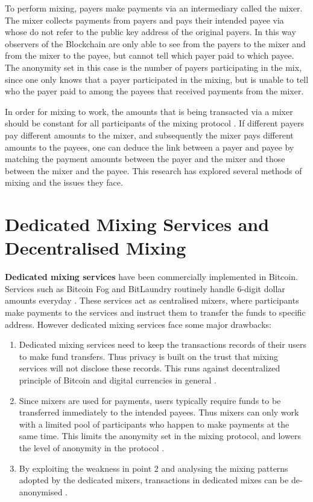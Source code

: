 To perform mixing, payers make payments via an intermediary called the mixer. The mixer collects payments from payers and pays their intended payee via  whose  do not refer to the public key address of the original payers. In this way observers of the Blockchain are only able to see   from the payers to the mixer and from the mixer to the payee, but cannot tell which payer paid to which payee. The anonymity set in this case is the number of payers participating in the mix, since one only knows that a payer participated in the mixing, but is unable to tell who the payer paid to among the payees that received payments from the mixer.

In order for mixing to work, the amounts that is being transacted via a mixer should be constant for all participants of the mixing protocol \cite{narayanan2016bitcoin}. If different payers pay different amounts to the mixer, and subsequently the mixer pays different amounts to the payees, one can deduce the link between a payer and payee by matching the payment amounts between the payer and the mixer and those between the mixer and the payee. This research has explored several methods of mixing and the issues they face. 

\section{Dedicated Mixing Services and Decentralised Mixing}
\label{sec:2-Dedicated Mixing Services and Decentralised Mixing}
\textbf{Dedicated mixing services} have been commercially implemented in Bitcoin. Services such as Bitcoin Fog and BitLaundry routinely handle 6-digit dollar amounts everyday \cite{Moser2013}. These services act as centralised mixers, where participants make payments to the services and instruct them to transfer the funds to specific address. However dedicated mixing services face some major drawbacks:

\begin{enumerate}
	\item Dedicated mixing services need to keep the transactions records of their users to make fund transfers. Thus privacy is built on the trust that mixing services will not disclose these records. This runs against decentralized principle of Bitcoin and digital currencies in general \cite{narayanan2016bitcoin}.
	\item Since mixers are used for payments, users typically require funds to be transferred immediately to the intended payees. Thus mixers can only work with a limited pool of participants who happen to make payments at the same time. This limits the anonymity set in the mixing protocol, and lowers the level of anonymity in the protocol \cite{narayanan2016bitcoin}.
	\item By exploiting the weakness in point 2 and analysing the mixing patterns adopted by the dedicated mixers, transactions in dedicated mixes can be de-anonymised \cite{Moser2013}. 
\end{enumerate}

